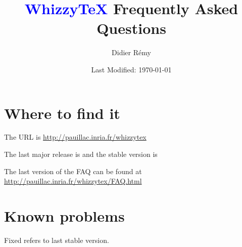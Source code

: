 \documentclass{article}
\title {\textcolor{blue}{WhizzyTeX}  Frequently Asked Questions}
\author {Didier R{\'{e}}my}
\date {Last Modified: \today}
\begin{document}
\maketitle

\tableofcontents

\section {Where to find it}

The URL is \url{http://pauillac.inria.fr/whizzytex}

The last major release is {\release}
and the stable version is {\version}

The last version of the FAQ can be found at 
\url{http://pauillac.inria.fr/whizzytex/FAQ.html}


\section {Known problems}

Fixed refers to last stable version.
\def \FIXED {\textit{Fixed in version > {\version}}}
\end{document}

